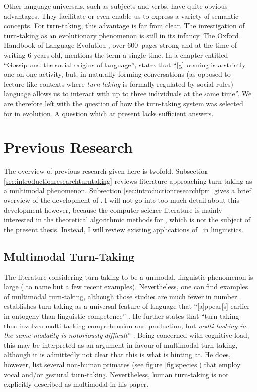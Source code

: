 Other language universals, such as subjects and verbs, have quite obvious advantages.
They facilitate or even enable us to express a variety of semantic concepts.
For turn-taking, this advantage is far from clear.
The investigation of turn-taking as an evolutionary phenomenon is still in its infancy.
The Oxford Handbook of Language Evolution \citep{tallerman_oxford_2012}, over 600~pages strong and at the time of writing 6 years old, mentions the term a single time.
In a chapter entitled ``Gossip and the social origins of language'', \citet[, emphasis mine]{dunbar_gossip_2012} states that ``[g]rooming is a strictly one-on-one activity, but, in naturally-forming conversations (as opposed to lecture-like contexts where \emph{turn-taking} is formally regulated by social rules) language allows us to interact with up to three individuals at the same time''.
We are therefore left with the question of how the turn-taking system was selected for in evolution.
A question which at present lacks sufficient answers.




\section{Previous Research}
\label{sec:introres}
The overview of previous research given here is twofold. Subsection \ref{sec:introductionresearchturntaking} reviews literature approaching turn-taking as a multimodal phenomenon.
Subsection \ref{sec:introductionresearchfpm} gives a brief overview of the development of \fpmlower.
I will not go into too much detail about this development however, because the computer science literature is mainly interested in the theoretical algorithmic methods for \fpmlower, which is not the subject of the present thesis.
Instead, I will review existing applications of \fpmlower\ in linguistics.


\subsection{Multimodal Turn-Taking}
\label{ssec:introrestt}
The literature considering turn-taking to be a unimodal, linguistic phenomenon is large (\citet{casillas_turn-taking_2016,freud_turn-taking_2016,heldner_pauses_2010} to name but a few recent examples).
Nevertheless, one can find examples of multimodal turn-taking, although those studies are much fewer in number.
\citet{levinson_turn-taking_2016} establishes turn-taking as a universal feature of language that ``[a]ppear[s] earlier in ontogeny than linguistic competence'' \citep[]{levinson_turn-taking_2016}.
He further states that ``turn-taking thus involves multi-tasking comprehension and production, but \emph{multi-tasking in the same modality is notoriously difficult}'' \citep[, emphasis mine]{levinson_turn-taking_2016}.
Being concerned with cognitive load, this may be interpreted as an argument in favour of multimodal turn-taking, although it is admittedly not clear that this is what \citeauthor{levinson_turn-taking_2016} is hinting at.
He does, however, list several non-human primates (see figure \ref{fig:species}) that employ vocal and/or gestural turn-taking.
Nevertheless, human turn-taking is not explicitly described as multimodal in his paper.

